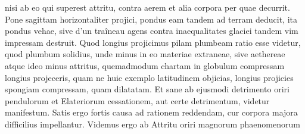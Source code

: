 nisi ab eo qui superest attritu\protect{}, contra aerem  et alia corpora per quae decurrit. Pone sagittam\protect{} horizontaliter projici, pondus\protect{} eam tandem ad terram deducit, ita pondus\protect{} vehae, sive d'un traîneau agens contra inaequalitates glaciei tandem vim\protect{} impressam destruit. Quod longius projicimus pilam\protect{} plumbeam  ratio esse videtur, quod plumbum\protect{} solidius, unde minus in eo materiae extraneae, sive aethereae atque ideo minus attritus\protect{}, quemadmodum chartam in globulum\protect{} compressam longius projeceris, quam  
\count{}
ne huic exemplo  latitudinem objicias, longius projicies spongiam compressam, quam dilatatam. Et sane ab ejusmodi detrimento\protect{} oriri pendulorum\protect{} et Elateriorum cessationem, aut certe detrimentum\protect{}, videtur manifestum. Satis ergo fortis causa ad rationem reddendam, cur corpora majora difficilius impellantur. Videmus ergo ab Attritu\protect{} oriri magnorum phaenomenorum%